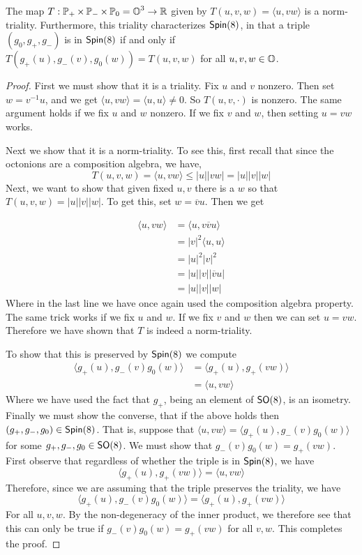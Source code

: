 \begin{thm}
The map $T:\operatorname{\mathbb{P}}_+\times \operatorname{\mathbb{P}}_-\times \operatorname{\mathbb{P}}_0 = \operatorname{\mathbb{O}}^3\to \operatorname{\mathbb{R}}$ given by $T(u,v,w)=\langle u,vw\rangle$ is a norm-triality. Furthermore, this triality characterizes $\operatorname{\textsf{Spin}}(8)$, in that a triple $(g_0,g_+,g_-)$ is in $ \operatorname{\textsf{Spin}}(8)$ if and only if $T(g_+(u),g_-(v),g_0(w))=T(u,v,w)$ for all $u,v,w\in \operatorname{\mathbb{O}}$.
\end{thm}
\begin{proof}
First we must show that it is a triality.
Fix $u$ and $v$ nonzero. Then set $w = v^{-1}u$, and we get $\langle u,vw\rangle = \langle u,u\rangle\neq 0$. So $T(u,v,\cdot)$ is nonzero. The same argument holds if we fix $u$ and $w$ nonzero. If we fix $v$ and $w$, then setting $u=vw$ works.

Next we show that it is a norm-triality. To see this, first recall that since the octonions are a composition algebra, we have,
\[T(u,v,w) = \langle u,vw\rangle \leq |u||vw| = |u||v||w|\]
Next, we want to show that given fixed $u,v$ there is a $w$ so that $T(u,v,w) = |u||v||w|$. To get this, set $w = \overline{v}u$. Then we get

\begin{align*}\langle u,vw\rangle &=\langle u,v\overline{v}u\rangle\\
&= |v|^2\langle u,u\rangle\\
&= |u|^2|v|^2\\
&= |u| |v| |\overline{v}u|\\
&= |u||v||w|
\end{align*}
Where in the last line we have once again used the composition algebra property. The same trick works if we fix $u$ and $w$. If we fix $v$ and $w$ then we can set $u=vw$. Therefore we have shown that $T$ is indeed a norm-triality.

To show that this is preserved by $\operatorname{\textsf{Spin}}(8)$ we compute
\begin{align*}
    \langle g_+(u),g_-(v)g_0(w)\rangle
    &= \langle g_+(u),g_+(vw)\rangle\\
    &= \langle u,vw\rangle
\end{align*}
Where we have used the fact that $g_+$, being an element of $\operatorname{\textsf{SO}}(8)$, is an isometry. Finally we must show the converse, that if the above holds then $(g_+,g_-,g_0)\in \operatorname{\textsf{Spin}}(8)$. That is, suppose that $\langle u,vw\rangle = \langle g_+(u),g_-(v)g_0(w)\rangle$ for some $g_+,g_-,g_0\in \operatorname{\textsf{SO}}(8)$. We must show that $g_-(v)g_0(w) = g_+(vw)$. First observe that regardless of whether the triple is in $\operatorname{\textsf{Spin}}(8)$, we have
\[\langle g_+(u),g_+(vw)\rangle=
     \langle u,vw\rangle\]
Therefore, since we are assuming that the triple preserves the triality, we have
\[\langle g_+(u),g_-(v)g_0(w)\rangle =\langle g_+(u),g_+(vw)\rangle \]
For all $u,v,w$. By the non-degeneracy of the inner product, we therefore see that this can only be true if $g_-(v)g_0(w) = g_+(vw)$ for all $v,w$. This completes the proof.
    
\end{proof}
